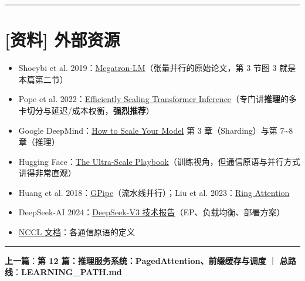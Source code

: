 \vspace{0.8em}\hrule\vspace{0.8em}

\section{[资料] 外部资源}

\begin{itemize}
  \item Shoeybi et al. 2019：\href{https://arxiv.org/abs/1909.08053}{Megatron-LM}（张量并行的原始论文，第 3 节图 3 就是本篇第二节）
  \item Pope et al. 2022：\href{https://arxiv.org/abs/2211.05102}{Efficiently Scaling Transformer Inference}（专门讲\textbf{推理}的多卡切分与延迟/成本权衡，\textbf{强烈推荐}）
  \item Google DeepMind：\href{https://jax-ml.github.io/scaling-book/}{How to Scale Your Model} 第 3 章（Sharding）与第 7\textasciitilde{}8 章（推理）
  \item Hugging Face：\href{https://huggingface.co/spaces/nanotron/ultrascale-playbook}{The Ultra-Scale Playbook}（训练视角，但通信原语与并行方式讲得非常直观）
  \item Huang et al. 2018：\href{https://arxiv.org/abs/1811.06965}{GPipe}（流水线并行）；Liu et al. 2023：\href{https://arxiv.org/abs/2310.01889}{Ring Attention}
  \item DeepSeek-AI 2024：\href{https://arxiv.org/abs/2412.19437}{DeepSeek-V3 技术报告}（EP、负载均衡、部署方案）
  \item {}\href{https://docs.nvidia.com/deeplearning/nccl/user-guide/docs/usage/collectives.html}{NCCL 文档}：各通信原语的定义
\end{itemize}

\vspace{0.8em}\hrule\vspace{0.8em}

\textbf{上一篇}：\textbf{第 12 篇：推理服务系统：PagedAttention、前缀缓存与调度} ｜ \textbf{总路线}：\textbf{LEARNING\_PATH.md}
